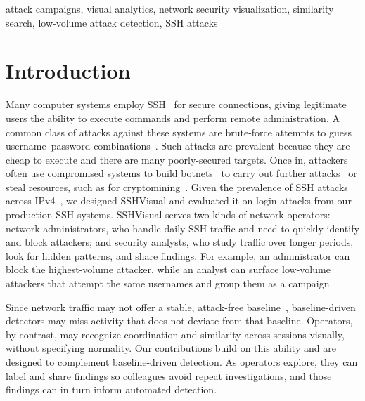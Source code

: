 \documentclass[conference]{IEEEtran}
\begin{document}
\begin{IEEEkeywords}
attack campaigns, visual analytics, network security visualization, similarity search, low-volume attack detection, SSH attacks
\end{IEEEkeywords}

\section{Introduction}
\label{sec:intro}
Many computer systems employ SSH~\cite{ylonen1996ssh} for secure connections, giving legitimate users the ability to execute commands and perform remote
administration.
A common class of attacks against these systems are brute-force attempts to guess username--password combinations~\cite{295683}. Such attacks are prevalent because they are cheap to execute and there are many poorly-secured targets.
Once in, attackers often use compromised systems to build botnets~\cite{295683} to carry out further attacks~\cite{antonakakis2017understanding, kolias2017ddos} or steal resources, such as for cryptomining~\cite{dang2019understanding, pastrana2019first}.
Given the prevalence of SSH attacks across IPv4~\cite{295683}, we designed SSHVisual and evaluated it on login attacks from our production SSH systems. 
SSHVisual serves two kinds of
network operators: network administrators, who handle daily SSH traffic and need to quickly identify and block attackers; and security analysts, who study traffic
over longer periods, look for hidden patterns, and share findings. For example, an administrator can block the highest-volume attacker, 
while an analyst can surface low-volume attackers that attempt the same usernames and group them as a campaign.

Since network traffic may not offer a stable, attack-free baseline~\cite{gates2006challenging}, baseline-driven detectors may miss activity that does not 
deviate from that baseline. Operators, by contrast, may recognize coordination and similarity across sessions visually, without specifying normality. 
Our contributions build on this ability and are designed to complement baseline-driven detection. As operators explore, they can label and share findings 
so colleagues avoid repeat investigations, and those findings can in turn inform automated detection.
\end{document}

